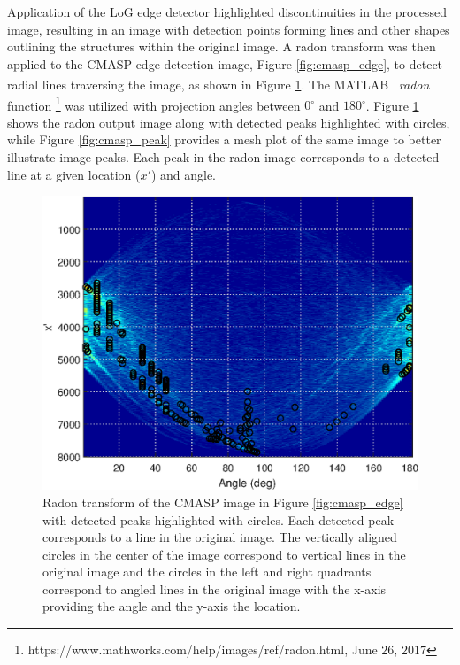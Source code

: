 Application of the LoG edge detector highlighted discontinuities in the processed image, resulting in an image with detection points forming lines and other shapes outlining the structures within the original image.  A radon transform \cite{Deans1981} was then applied to the CMASP edge detection image, Figure \ref{fig:cmasp_edge}, to detect radial lines traversing the image, as shown in Figure \ref{fig:cmasp_radon}.  The MATLAB\textsuperscript \textregistered ~ \textit{radon} function \footnote{https://www.mathworks.com/help/images/ref/radon.html, June $26$, $2017$} was utilized with projection angles between $0^{\circ}$ and $180^{\circ}$.  Figure \ref{fig:cmasp_radon} shows the radon output image along with detected peaks highlighted with circles, while Figure \ref{fig:cmasp_peak} provides a mesh plot of the same image to better illustrate image peaks.  Each peak in the radon image corresponds to a detected line at a given location ($x'$) and angle.
  
\begin{figure}[tb]
	\includegraphics[width=\textwidth]{./dasp_algorithm_results/cmasp_radon_filenum_9601.eps}
	\centering
	\caption{Radon transform of the CMASP image in Figure \ref{fig:cmasp_edge} with detected peaks highlighted with circles.  Each detected peak corresponds to a line in the original image.  The vertically aligned circles in the center of the image correspond to vertical lines in the original image and the circles in the left and right quadrants correspond to angled lines in the original image with the x-axis providing the angle and the y-axis the location.}
	\label{fig:cmasp_radon}
\end{figure}

